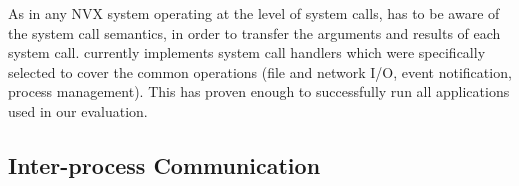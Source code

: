 As in any NVX system operating at the level of system calls, \vx has
to be aware of the system call semantics, in order to transfer the
arguments and results of each system call.  \vx currently implements
\syscallsHandlers system call handlers which were specifically selected
to cover the common operations (file and network I/O, event
notification, process management). This has proven enough to
successfully run all applications used in our evaluation.







\subsection{Inter-process Communication}
\label{sec:ipc}


